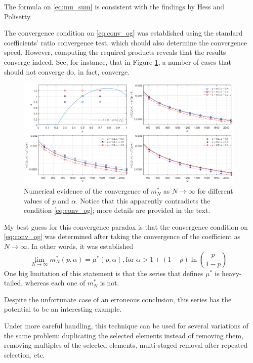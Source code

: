 \documentclass{article}
\newcommand{\ppar}[1]{\left( #1 \right)}
\begin{document}
The formula on \eqref{eq:mu_sum} is consistent with the findings by Hess and Polisetty.

The convergence condition on \eqref{eq:conv_og} was established using the standard coefficients' ratio convergence test, which should also determine the convergence speed.
%
However, computing the required products reveals that the results converge indeed.
%
See, for instance, that in Figure \ref{fig:onlyfig}, a number of cases that should not converge do, in fact, converge.

\begin{figure}
    \centering
    \includegraphics[width=\linewidth]{./img/paradox.png}
    \caption{Numerical evidence of the convergence of $m^*_N$ as $N\rightarrow \infty$ for different values of $p$ and $\alpha$. Notice that this apparently contradicts the condition \eqref{eq:conv_og}; more details are provided in the text.}
    \label{fig:onlyfig}
\end{figure}

My best guess for this convergence paradox is that the convergence condition on \eqref{eq:conv_og} was determined after taking the convergence of the coefficient as $N\rightarrow \infty$.
%
In other words, it was established
\begin{equation}
    \lim_{N \rightarrow \infty} m^*_N (p, \alpha) = \mu^*(p,\alpha), \text{for }\alpha > 1 + \ppar{1-p} \ln{\ppar{\frac{p}{1-p}}} 
\end{equation}
One big limitation of this statement is that the series that defines $\mu^*$ is heavy-tailed, whereas each one of $m^*_N$ is not.

Despite the unfortunate case of an erroneous conclusion, this series has the potential to be an interesting example.

Under more careful handling, this technique can be used for several variations of the same problem: duplicating the selected elements instead of removing them, removing multiples of the selected elements, multi-staged removal after repeated selection, etc.
\end{document}
